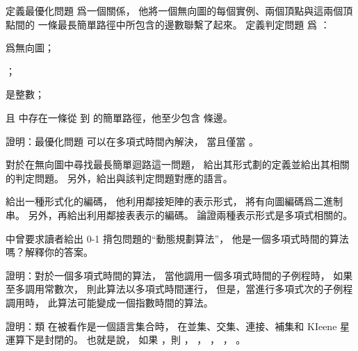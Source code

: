 \startsection[
  title={Polynomial time},
]

\startEXERCISE
定義最優化問題  爲一個關係，
他將一個無向圖的每個實例、兩個頂點與這兩個頂點間的
一條最長簡單路徑中所包含的邊數聯繫了起來。
定義判定問題  爲 ：
\startigBase[2]
\item {} 爲無向圖；
\item {}；
\item {} 是整數；
\item 且  中存在一條從  到  的簡單路徑，他至少包含  條邊。
\stopigBase

證明：最優化問題  可以在多項式時間內解決，
當且僅當 。
\stopEXERCISE

\startANSWER
{}
\stopANSWER

\startEXERCISE
對於在無向圖中尋找最長簡單迴路這一問題，
給出其形式劃的定義並給出其相關的判定問題。
另外，給出與該判定問題對應的語言。
\stopEXERCISE

\startANSWER
{}
\stopANSWER

\startEXERCISE
給出一種形式化的編碼，
他利用鄰接矩陣的表示形式，
將有向圖編碼爲二進制串。
另外，再給出利用鄰接表表示的編碼。
論證兩種表示形式是多項式相關的。
\stopEXERCISE

\startANSWER
{}
\stopANSWER

\startEXERCISE
{} 中曾要求讀者給出 0-1 揹包問題的“動態規劃算法”，
他是一個多項式時間的算法嗎？解釋你的答案。
\stopEXERCISE

\startANSWER
{}
\stopANSWER

\startEXERCISE
證明：對於一個多項式時間的算法，
當他調用一個多項式時間的子例程時，
如果至多調用常數次，
則此算法以多項式時間運行，
但是，當進行多項式次的子例程調用時，
此算法可能變成一個指數時間的算法。
\stopEXERCISE

\startANSWER
{}
\stopANSWER

\startEXERCISE
證明：類  在被看作是一個語言集合時，
在並集、交集、連接、補集和 KIeene 星運算下是封閉的。
也就是說，
如果 ，則 ，
 ， ， ， 。
\stopEXERCISE

\startANSWER
{}
\stopANSWER

\stopsection
